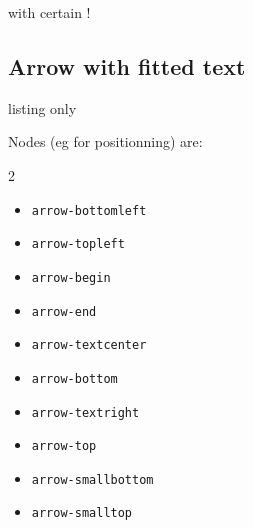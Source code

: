 \documentclass[11pt,a4paper]{ltxdoc}
\begin{document}
\begin{DemoCode}{}
 with
 certain
!
\end{DemoCode}

\pagebreak

\subsection{Arrow with fitted text}

\begin{DemoCode}{listing only}

\end{DemoCode}

Nodes (eg for positionning) are:
%
\begin{multicols}{2}
  \begin{itemize}
    \item \texttt{arrow-bottomleft}
    \item \texttt{arrow-topleft}
    \item \texttt{arrow-begin}
    \item \texttt{arrow-end}
    \item \texttt{arrow-textcenter}
    \item \texttt{arrow-bottom}
    \item \texttt{arrow-textright}
    \item \texttt{arrow-top}
    \item \texttt{arrow-smallbottom}
    \item \texttt{arrow-smalltop}
  \end{itemize}
\end{multicols}

\begin{DemoCode}{}
\end{DemoCode}
\end{document}
